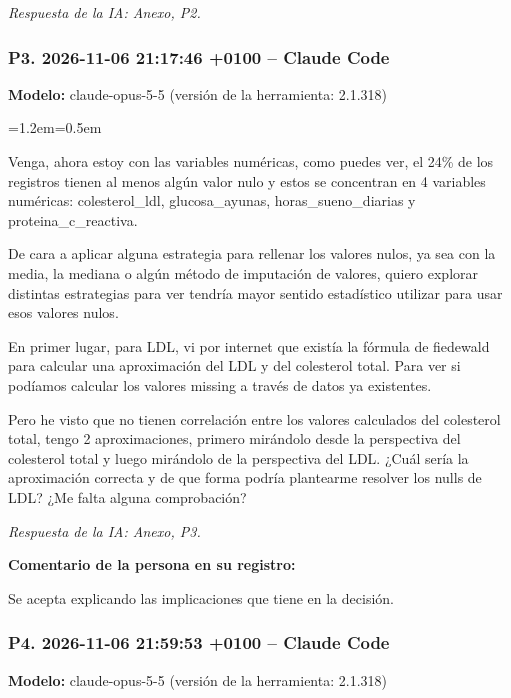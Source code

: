 \documentclass[11pt,a4paper]{article}
\newenvironment{prompt}
  {\par\smallskip\begin{list}{}{\leftmargin=1.2em\rightmargin=0.5em}\item\relax\small\color{black!80}}
  {\end{list}\smallskip}
\begin{document}
\textit{Respuesta de la IA: Anexo, P2.}

\subsubsection*{P3. 2026-11-06 21:17:46 +0100 -- Claude Code}
\textbf{Modelo:} claude-opus-5-5 (versión de la herramienta: 2.1.318)

\begin{prompt}
Venga, ahora estoy con las variables numéricas, como puedes ver, el 24\% de los registros tienen al menos algún valor nulo y estos se concentran en 4 variables numéricas: colesterol\_\allowbreak{}ldl, glucosa\_\allowbreak{}ayunas, horas\_\allowbreak{}sueno\_\allowbreak{}diarias y proteina\_\allowbreak{}c\_\allowbreak{}reactiva.

De cara a aplicar alguna estrategia para rellenar los valores nulos, ya sea con la media, la mediana o algún método de imputación de valores, quiero explorar distintas estrategias para ver tendría mayor sentido estadístico utilizar para usar esos valores nulos.

En primer lugar, para LDL, vi por internet que existía la fórmula de fiedewald para calcular una aproximación del LDL y del colesterol total. Para ver si podíamos calcular los valores missing a través de datos ya existentes.

Pero he visto que no tienen correlación entre los valores calculados del colesterol total, tengo 2 aproximaciones, primero mirándolo desde la perspectiva del colesterol total y luego mirándolo de la perspectiva del LDL. ¿Cuál sería la aproximación correcta y de que forma podría plantearme resolver los nulls de LDL? ¿Me falta alguna comprobación?
\end{prompt}

\textit{Respuesta de la IA: Anexo, P3.}

\textbf{Comentario de la persona en su registro:}

Se acepta explicando las implicaciones que tiene en la decisión.

\subsubsection*{P4. 2026-11-06 21:59:53 +0100 -- Claude Code}
\textbf{Modelo:} claude-opus-5-5 (versión de la herramienta: 2.1.318)
\end{document}
